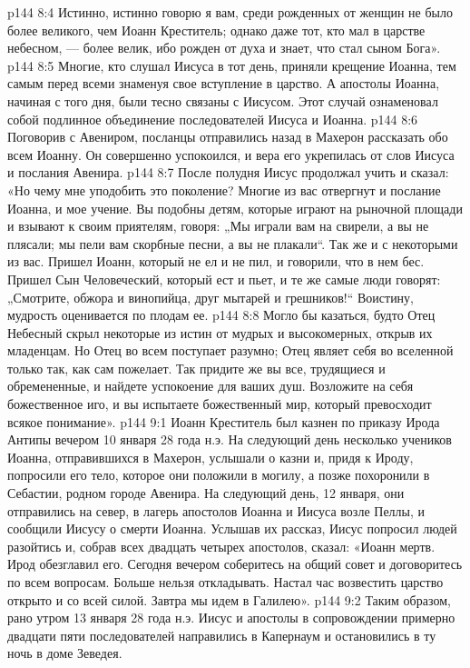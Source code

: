\vs p144 8:4 Истинно, истинно говорю я вам, среди рожденных от женщин не было более великого, чем Иоанн Креститель; однако даже тот, кто мал в царстве небесном, --- более велик, ибо рожден от духа и знает, что стал сыном Бога».
\vs p144 8:5 Многие, кто слушал Иисуса в тот день, приняли крещение Иоанна, тем самым перед всеми знаменуя свое вступление в царство. А апостолы Иоанна, начиная с того дня, были тесно связаны с Иисусом. Этот случай ознаменовал собой подлинное объединение последователей Иисуса и Иоанна.
\vs p144 8:6 Поговорив с Авениром, посланцы отправились назад в Махерон рассказать обо всем Иоанну. Он совершенно успокоился, и вера его укрепилась от слов Иисуса и послания Авенира.
\vs p144 8:7 После полудня Иисус продолжал учить и сказал: «Но чему мне уподобить это поколение? Многие из вас отвергнут и послание Иоанна, и мое учение. Вы подобны детям, которые играют на рыночной площади и взывают к своим приятелям, говоря: „Мы играли вам на свирели, а вы не плясали; мы пели вам скорбные песни, а вы не плакали“. Так же и с некоторыми из вас. Пришел Иоанн, который не ел и не пил, и говорили, что в нем бес. Пришел Сын Человеческий, который ест и пьет, и те же самые люди говорят: „Смотрите, обжора и винопийца, друг мытарей и грешников!“ Воистину, мудрость оценивается по плодам ее.
\vs p144 8:8 Могло бы казаться, будто Отец Небесный скрыл некоторые из истин от мудрых и высокомерных, открыв их младенцам. Но Отец во всем поступает разумно; Отец являет себя во вселенной только так, как сам пожелает. Так придите же вы все, трудящиеся и обремененные, и найдете успокоение для ваших душ. Возложите на себя божественное иго, и вы испытаете божественный мир, который превосходит всякое понимание».
\vs p144 9:1 Иоанн Креститель был казнен по приказу Ирода Антипы вечером 10 января 28 года н.э. На следующий день несколько учеников Иоанна, отправившихся в Махерон, услышали о казни и, придя к Ироду, попросили его тело, которое они положили в могилу, а позже похоронили в Себастии, родном городе Авенира. На следующий день, 12 января, они отправились на север, в лагерь апостолов Иоанна и Иисуса возле Пеллы, и сообщили Иисусу о смерти Иоанна. Услышав их рассказ, Иисус попросил людей разойтись и, собрав всех двадцать четырех апостолов, сказал: «Иоанн мертв. Ирод обезглавил его. Сегодня вечером соберитесь на общий совет и договоритесь по всем вопросам. Больше нельзя откладывать. Настал час возвестить царство открыто и со всей силой. Завтра мы идем в Галилею».
\vs p144 9:2 Таким образом, рано утром 13 января 28 года н.э. Иисус и апостолы в сопровождении примерно двадцати пяти последователей направились в Капернаум и остановились в ту ночь в доме Зеведея.
